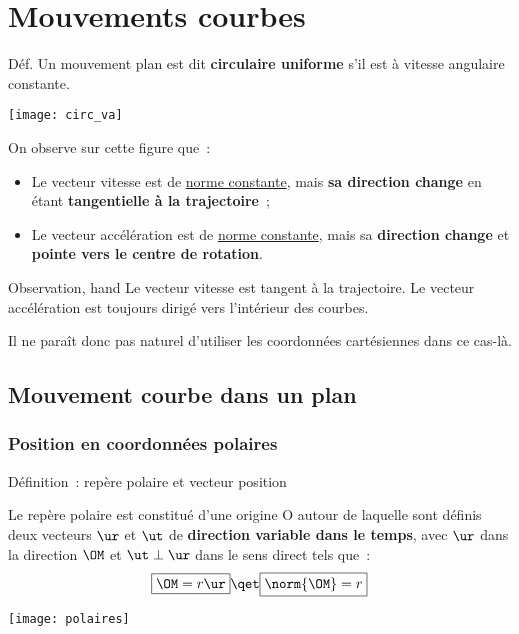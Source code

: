 \documentclass[../main/main.tex]{subfiles}
\begin{document}
\setcounter{chapter}{2}

\chapter{Mouvements courbes}

\begin{rdefi}{Déf.}
    Un mouvement plan est dit \textbf{circulaire uniforme} s'il est à vitesse
    angulaire constante.
\end{rdefi}

\begin{center}
    \texttt{[image: circ\_va]}
\end{center}

On observe sur cette figure que~: \bigbreak
\begin{itemize}
    \item Le vecteur vitesse est de \underline{norme constante}, mais \textbf{sa
        direction change} en étant \textbf{tangentielle à la trajectoire}~;
    \item Le vecteur accélération est de \underline{norme constante}, mais sa
        \textbf{direction change} et \textbf{pointe vers le centre de rotation}.
\end{itemize}

\begin{tror}{Observation, hand}
    \centering
    Le vecteur vitesse est tangent à la trajectoire. Le vecteur accélération est
    toujours dirigé vers l’intérieur des courbes.
\end{tror}

Il ne paraît donc pas naturel d'utiliser les coordonnées cartésiennes dans ce
cas-là.

\section{Mouvement courbe dans un plan}
\subsection{Position en coordonnées polaires}

\begin{tdefi}{Définition~: repère polaire et vecteur position}
    \begin{minipage}{0.60\linewidth}
        Le repère polaire est constitué d'une origine O autour de laquelle sont
        définis deux vecteurs $\ur$ et $\ut$ de \textbf{direction
        variable dans le temps}, avec $\ur$ dans la direction $\OM$ et $\ut
        \perp \ur$ dans le sens direct tels que~:
        \[\boxed{\OM = r\ur}
        \qet
        \boxed{\norm{\OM} = r}\]
    \end{minipage}
    \hfill
    \begin{minipage}{0.35\linewidth}
        \begin{center}
            \texttt{[image: polaires]}
        \end{center}
    \end{minipage}
\end{tdefi}
\end{document}
